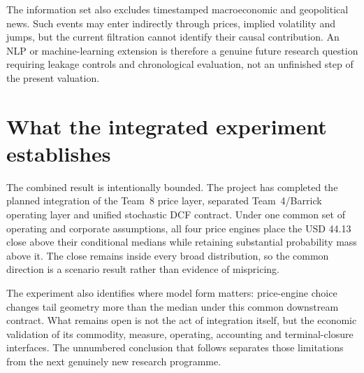 The information set also excludes timestamped macroeconomic and geopolitical
news. Such events may enter indirectly through prices, implied volatility and
jumps, but the current filtration cannot identify their causal contribution.
An NLP or machine-learning extension is therefore a genuine future research
question requiring leakage controls and chronological evaluation, not an
unfinished step of the present valuation.

\section{What the integrated experiment establishes}

The combined result is intentionally bounded. The project has completed the
planned integration of the Team~8 price layer, separated Team~4/Barrick
operating layer and unified stochastic DCF contract. Under one common set of operating and corporate
assumptions, all four price engines place the USD 44.13 close above their
conditional medians while retaining substantial probability mass above it.
The close remains inside every broad distribution, so the common direction is
a scenario result rather than evidence of mispricing.

The experiment also identifies where model form matters: price-engine choice
changes tail geometry more than the median under this common downstream
contract. What remains open is not the act of integration itself, but the
economic validation of its commodity, measure, operating, accounting and
terminal-closure interfaces. The unnumbered conclusion that follows separates
those limitations from the next genuinely new research programme.
